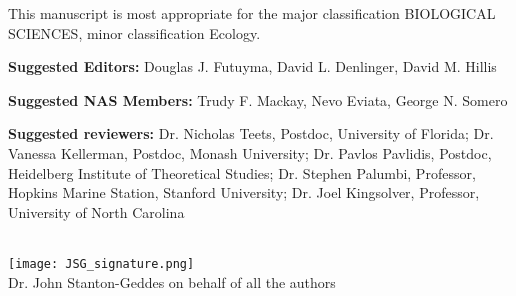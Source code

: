 \documentclass[letterpaper]{article}
\begin{document}
This manuscript is most appropriate for the major classification
BIOLOGICAL SCIENCES, minor classification Ecology.

\textbf{Suggested Editors:} Douglas J. Futuyma, David L. Denlinger, David M. Hillis

\textbf{Suggested NAS Members:} Trudy F. Mackay, Nevo Eviata, George N. Somero

\textbf{Suggested reviewers:}  Dr. Nicholas Teets, Postdoc, University of Florida; Dr. Vanessa Kellerman, Postdoc, Monash University; Dr. Pavlos Pavlidis, Postdoc, Heidelberg Institute of Theoretical Studies; Dr. Stephen Palumbi, Professor, Hopkins Marine Station, Stanford University; Dr. Joel Kingsolver, Professor, University of North Carolina

 \\
\texttt{[image: JSG\_signature.png]}  \\
Dr. John Stanton-Geddes on behalf of all the authors
\end{document}
